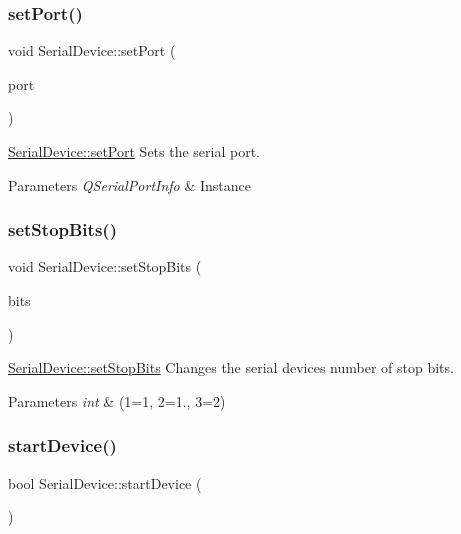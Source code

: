 \subsubsection{\texorpdfstring{set\+Port()}{setPort()}}
{\footnotesize\ttfamily void Serial\+Device\+::set\+Port (\begin{DoxyParamCaption}\item[{Q\+Serial\+Port\+Info}]{port }\end{DoxyParamCaption})}



\hyperlink{class_serial_device_a1440b389cc1bba66e9854a32a5807a8f}{Serial\+Device\+::set\+Port} Sets the serial port. 


\begin{DoxyParams}{Parameters}
{\em Q\+Serial\+Port\+Info} & Instance \\
\hline
\end{DoxyParams}
\hypertarget{class_serial_device_a95b44d8167ae0a6a025ba9c4f2d5ee47}{}\label{class_serial_device_a95b44d8167ae0a6a025ba9c4f2d5ee47} 
\subsubsection{\texorpdfstring{set\+Stop\+Bits()}{setStopBits()}}
{\footnotesize\ttfamily void Serial\+Device\+::set\+Stop\+Bits (\begin{DoxyParamCaption}\item[{int}]{bits }\end{DoxyParamCaption})}



\hyperlink{class_serial_device_a95b44d8167ae0a6a025ba9c4f2d5ee47}{Serial\+Device\+::set\+Stop\+Bits} Changes the serial device\textquotesingle{}s number of stop bits. 


\begin{DoxyParams}{Parameters}
{\em int} & (1=1, 2=1., 3=2) \\
\hline
\end{DoxyParams}
\hypertarget{class_serial_device_a6940a33b7c8f4b83438d16cfa7d8d3ff}{}\label{class_serial_device_a6940a33b7c8f4b83438d16cfa7d8d3ff} 
\subsubsection{\texorpdfstring{start\+Device()}{startDevice()}}
{\footnotesize\ttfamily bool Serial\+Device\+::start\+Device (\begin{DoxyParamCaption}{ }\end{DoxyParamCaption})\hspace{0.3cm}{\ttfamily [virtual]}}



